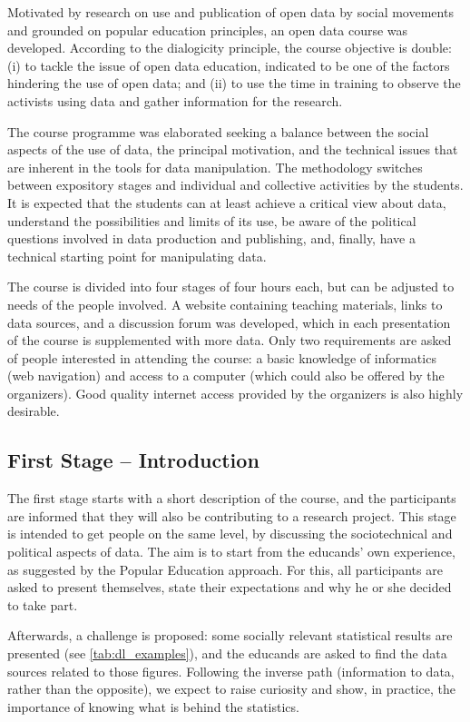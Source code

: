 \label{dl_method} 

Motivated by research on use and publication of open data by social movements and grounded on popular education principles, an open data course was developed. According to the dialogicity principle, the course objective is double: (i) to tackle the issue of open data education, indicated to be one of the factors hindering the use of open data; and (ii) to use the time in training to observe the activists using data and gather information for the research.

The course programme was elaborated seeking a balance between the social aspects of the use of data, the principal motivation, and the technical issues that are inherent in the tools for data manipulation. The methodology switches between expository stages and individual and collective activities by the students. It is expected that the students can at least achieve a critical view about data, understand the possibilities and limits of its use, be aware of the political questions involved in data production and publishing, and, finally, have a technical starting point for manipulating data.

The course is divided into four stages of four hours each, but can be adjusted to needs of the people involved. A website containing teaching materials, links to data sources, and a discussion forum was developed, which in each presentation of the course is supplemented with more data.
Only two requirements are asked of people interested in attending the course: a basic knowledge of informatics (web navigation) and access to a computer (which could also be offered by the organizers). Good quality internet access provided by the organizers is also highly desirable.

\subsection{First Stage – Introduction}

The first stage starts with a short description of the course, and the participants are informed that they will also be contributing to a research project. This stage is intended to get people on the same level, by discussing the sociotechnical and political aspects of data. The aim is to start from the educands' own experience, as suggested by the Popular Education approach. For this, all participants are asked to present themselves, state their expectations and why he or she decided to take part.

Afterwards, a challenge is proposed: some socially relevant statistical results are presented (see \autoref{tab:dl_examples}), and the educands are asked to find the data sources related to those figures. Following the inverse path (information to data, rather than the opposite), we expect to raise curiosity and show, in practice, the importance of knowing what is behind the statistics.

